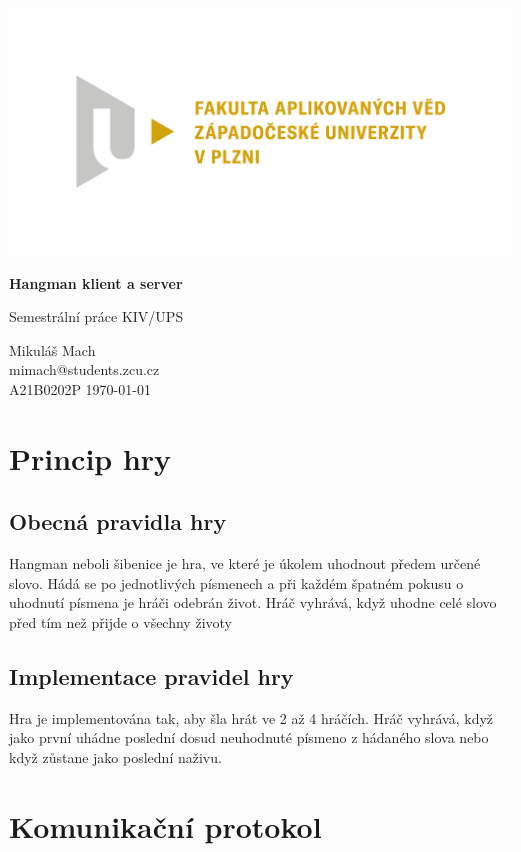 \documentclass[12pt]{report}
\begin{document}
	
	\begin{titlepage}
		\centering
		\Large
		
		\includegraphics[width=.7\textwidth]{fav}
		
		\vspace{15mm}
		{\Huge\bfseries Hangman klient a server}
		
		\vspace{15mm}
		{\LARGE Semestrální práce KIV/UPS}
		
		\vfill
		\raggedright
		Mikuláš Mach\\
		mimach@students.zcu.cz\\
		A21B0202P
		\hfill 
		\today
	\end{titlepage}
	
	\tableofcontents
	
	\chapter{Princip hry}
	\section{Obecná pravidla hry}
		Hangman neboli šibenice je hra, ve které je úkolem uhodnout předem určené slovo. Hádá se po jednotlivých písmenech a při každém špatném pokusu o uhodnutí písmena je hráči odebrán život. Hráč vyhrává, když uhodne celé slovo před tím než přijde o všechny životy
	\section{Implementace pravidel hry}
		Hra je implementována tak, aby šla hrát ve 2 až 4 hráčích. Hráč vyhrává, když jako první uhádne poslední dosud neuhodnuté písmeno z hádaného slova nebo když zůstane jako poslední naživu.

	
	\chapter{Komunikační protokol}
	
\end{document}

